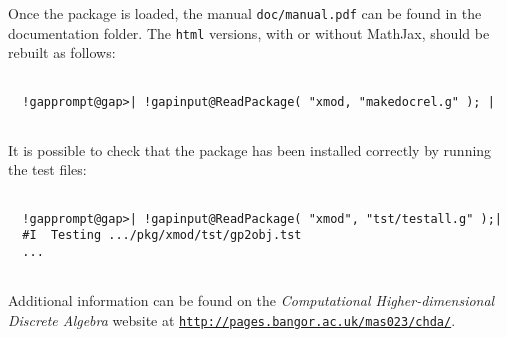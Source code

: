 \documentclass[a4paper,11pt]{report}
\begin{document}
{\begin{Verbatim}[commandchars=!@|,fontsize=\small,frame=single,label=Example]
\end{Verbatim}
 

 Once the package is loaded, the manual \texttt{doc/manual.pdf} can be found in the documentation folder. The \texttt{html} versions, with or without MathJax, should be rebuilt as follows: 

 
\begin{Verbatim}[commandchars=!@|,fontsize=\small,frame=single,label=Example]
  
  !gapprompt@gap>| !gapinput@ReadPackage( "xmod, "makedocrel.g" ); |
  
\end{Verbatim}
 

 It is possible to check that the package has been installed correctly by
running the test files: 

 
\begin{Verbatim}[commandchars=!@|,fontsize=\small,frame=single,label=Example]
  
  !gapprompt@gap>| !gapinput@ReadPackage( "xmod", "tst/testall.g" );|
  #I  Testing .../pkg/xmod/tst/gp2obj.tst 
  ... 
  
\end{Verbatim}
 

 Additional information can be found on the \emph{Computational Higher-dimensional Discrete Algebra} website at \href{http://pages.bangor.ac.uk/~mas023/chda/} {\texttt{http://pages.bangor.ac.uk/\texttt{}mas023/chda/}}. }

            
\end{document}
